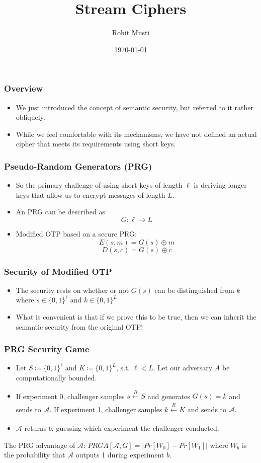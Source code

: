\documentclass{beamer}
\title{Stream Ciphers}
\author{Rohit Musti}
\institute{CUNY - Hunter College}
\date{\today}
\begin{document}
 
\frame{\titlepage}


\begin{frame}
\frametitle{Overview}
\begin{itemize}
    \item We just introduced the concept of semantic security, but referred to it rather obliquely. \pause
    \item While we feel comfortable with its mechanisms, we have not defined an actual cipher that meets its requirements using short keys. 
\end{itemize}
\end{frame}

\begin{frame}
\frametitle{Pseudo-Random Generators (PRG)}
\begin{itemize}
    \item So the primary challenge of using short keys of length \(\ell\) is deriving longer keys that allow us to encrypt messages of length \(L\). \pause 
    \item An PRG can be described as \[ G: \ell \rightarrow L\] \pause
    \item Modified OTP based on a secure PRG: \[ E(s, m) = G(s) \oplus m\] \pause \[ D(s, c) = G(s) \oplus c \]
\end{itemize}
\end{frame}

\begin{frame}
\frametitle{Security of Modified OTP}
\begin{itemize}
    \item The security rests on whether or not \(G(s)\) can be distinguished from \(k\) where \(s \in \{0, 1\}^{\ell}\) and \(k \in \{0, 1\}^{L}\) \pause
    \item What is convenient is that if we prove this to be true, then we can inherit the semantic security from the original OTP! 
\end{itemize}
\end{frame}

\begin{frame}
\frametitle{PRG Security Game}
\begin{itemize}
    \item Let \(S \coloneqq \{0, 1\}^{\ell}\) and \(K \coloneqq \{0, 1\}^{L}\), s.t. \(\ell < L\). Let our adversary \(A\) be computationally bounded. \pause
    \item If experiment 0, challenger samples \(s \xleftarrow[]{R} S\) and generates \(G(s) = k\) and sends to \(\mathcal{A}\). \pause If experiment 1, challenger samples \(k \xleftarrow[]{R} K\) and sends to \(\mathcal{A}\). \pause
    \item \(\mathcal{A}\) returns \(b\), guessing which experiment the challenger conducted. \pause
\end{itemize}

The PRG advantage of \(\mathcal{A}\): \(PRGA[\mathcal{A}, G] = |Pr[W_0] - Pr[W_1]|\) where \(W_b\) is the probability that \(\mathcal{A}\) outputs 1 during experiment \(b\).

\end{frame}
\end{document}
